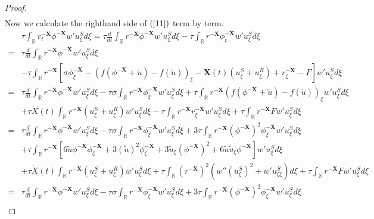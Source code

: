 \documentclass[10pt,reqno]{amsart}
\numberwithin{equation}{section}
\begin{document}
\begin{proof}
\begin{align}
		\end{align}
		Now we calculate the righthand side of $(\ref{11})$ term by term.
		\begin{align*}
			&\tau\int_{\mathbb{R}}r_{t}^{-\mathbf{X}}\phi^{-\mathbf{X}}w'u_{\xi}^Sd\xi=\tau\frac{d}{dt}\int_{\mathbb{R}}r^{-\mathbf{X}}\phi^{-\mathbf{X}}w'u_{\xi}^{S}d\xi-\tau\int_{\mathbb{R}}r^{-\mathbf{X}}\phi_{t}^{-\mathbf{X}}w'u_{\xi}^Sd\xi\\
			=&\tau\frac{d}{dt}\int_{\mathbb{R}}r^{-\mathbf{X}}\phi^{-\mathbf{X}}w'u_{\xi}^{S}d\xi\\
			&-\tau\int_{\mathbb{R}}r^{-\mathbf{X}}\left[\sigma\phi_{\xi}^{-\mathbf{X}}-\left(f(\phi^{-\mathbf{X}}+\tilde{u})-f(\tilde{u})\right)_{\xi}-\mathbf{X}(t)(u_{\xi}^S+u_{\xi}^R)+r_{\xi}^{-\mathbf{X}}-F\right]w'u_{\xi}^Sd\xi\\
			=&\tau\frac{d}{dt}\int_{\mathbb{R}}r^{-\mathbf{X}}\phi^{-\mathbf{X}}w'u_{\xi}^{S}d\xi-\tau\sigma\int_{\mathbb{R}}r^{-\mathbf{X}}\phi_{\xi}^{-\mathbf{X}}w'u_{\xi}^Sd\xi+\tau\int_{\mathbb{R}}r^{-\mathbf{X}}\left(f(\phi^{-\mathbf{X}}+\tilde{u})-f(\tilde{u})\right)_{\xi}w'u_{\xi}^Sd\xi\\
			&+\tau \dot{X}(t)\int_{\mathbb{R}}r^{-\mathbf{X}}\left(u_{\xi}^{S}+u_{\xi}^{R}\right)w'u_{\xi}^{S}d\xi-\tau\int_{\mathbb{R}}r^{-\mathbf{X}}r_{\xi}^{-\mathbf{X}}w'u_{\xi}^Sd\xi+\tau\int_{\mathbb{R}}r^{-\mathbf{X}}Fw'u_{\xi}^Sd\xi\\
			=&\tau\frac{d}{dt}\int_{\mathbb{R}}r^{-\mathbf{X}}\phi^{-\mathbf{X}}w'u_{\xi}^{S}d\xi-\tau\sigma\int_{\mathbb{R}}r^{-\mathbf{X}}\phi_{\xi}^{-\mathbf{X}}w'u_{\xi}^Sd\xi+3\tau\int_{\mathbb{R}}r^{-\mathbf{X}}(\phi^{-\mathbf{X}})^2\phi_{\xi}^{-\mathbf{X}}w'u_{\xi}^Sd\xi\\
			&+\tau\int_{\mathbb{R}}r^{-\mathbf{X}}\left[6\tilde{u}\phi^{-\mathbf{X}}\phi_{\xi}^{-\mathbf{X}}+3(\tilde{u})^{2}\phi_{\xi}^{-\mathbf{X}}+3\tilde{u}_{\xi}(\phi^{-\mathbf{X}})^{2}+6\tilde{u}\tilde{u}_{\xi}\phi^{-\mathbf{X}}\right]w'u_{\xi}^{S}d\xi\\
			&+\tau \dot{X}(t)\int_{\mathbb{R}}r^{-\mathbf{X}}\left(u_{\xi}^{S}+u_{\xi}^{R}\right)w'u_{\xi}^{S}d\xi+\tau\int_{\mathbb{R}}(r^{-\mathbf{X}})^{2}\left(w''(u_{\xi}^{S})^{2}+w'u_{\xi\xi}^{S}\right)d\xi+\tau\int_{\mathbb{R}}r^{-\mathbf{X}}Fw'u_{\xi}^Sd\xi\\
			=&\tau\frac{d}{dt}\int_{\mathbb{R}}r^{-\mathbf{X}}\phi^{-\mathbf{X}}w'u_{\xi}^{S}d\xi-\tau\sigma\int_{\mathbb{R}}r^{-\mathbf{X}}\phi_{\xi}^{-\mathbf{X}}w'u_{\xi}^Sd\xi+3\tau\int_{\mathbb{R}}r^{-\mathbf{X}}(\phi^{-\mathbf{X}})^2\phi_{\xi}^{-\mathbf{X}}w'u_{\xi}^Sd\xi\\

\end{align*}
\end{proof}
\end{document}
